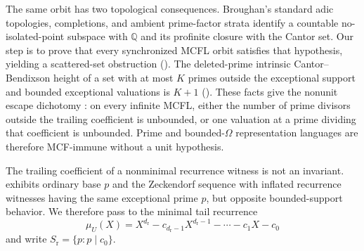 The same orbit has two topological consequences. Broughan's standard adic
topologies, completions, and ambient prime-factor strata identify a
countable no-isolated-point subspace with \(\mathbb Q\) and its profinite
closure with the Cantor set. Our step is to prove that every synchronized
MCFL orbit satisfies that hypothesis,
yielding a scattered-set obstruction
(). The deleted-prime intrinsic
Cantor--Bendixson height of a set with at most \(K\) primes outside the
exceptional support and bounded exceptional valuations is \(K+1\)
(). These facts give the nonunit
escape dichotomy : on every
infinite MCFL, either the number of prime divisors outside the trailing
coefficient is unbounded, or one valuation at a prime dividing that
coefficient is unbounded. Prime and bounded-\(\Omega\) representation
languages are therefore MCF-immune without a unit hypothesis.

The trailing coefficient of a nonminimal recurrence witness is not an
invariant.  exhibits ordinary
base \(p\) and the Zeckendorf sequence with inflated recurrence witnesses
having the same exceptional prime \(p\), but opposite bounded-support
behavior. We therefore pass to the minimal tail recurrence
\[
  \mu_U(X)=X^{d_{\mathrm r}}-c_{d_{\mathrm r}-1}X^{d_{\mathrm r}-1}
    -\cdots-c_1X-c_0
\]
and write \(S_{\mathrm r}=\{p:p\mid c_0\}\).

